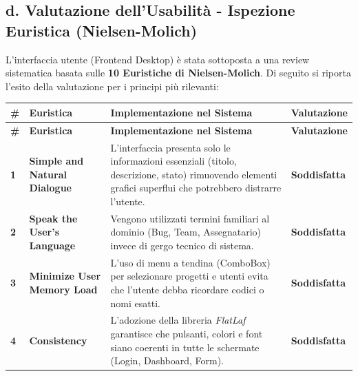 \documentclass[a4paper,12pt]{article}
\begin{document}
\newpage
\subsection*{d. Valutazione dell'Usabilità - Ispezione Euristica (Nielsen-Molich)}
L'interfaccia utente (Frontend Desktop) è stata sottoposta a una review sistematica basata sulle \textbf{10 Euristiche di Nielsen-Molich}. Di seguito si riporta l'esito della valutazione per i principi più rilevanti:
{}

\renewcommand{\arraystretch}{1.5}
\begin{longtable}{|p{0.8cm}|p{4.5cm}|p{5.0cm}|p{3.5cm}|}
    \hline
    \rowcolor{UninaBlue} 
    \textbf{\color{white}\#} & \textbf{\color{white}Euristica} & \textbf{\color{white}Implementazione nel Sistema} & \textbf{\color{white}Valutazione} \\ 
    \hline
    \endfirsthead
    \hline
    \rowcolor{UninaBlue} 
    \textbf{\color{white}\#} & \textbf{\color{white}Euristica} & \textbf{\color{white}Implementazione nel Sistema} & \textbf{\color{white}Valutazione} \\ 
    \hline
    \endhead

    \textbf{1} & \textbf{Simple and Natural Dialogue} & 
    L'interfaccia presenta solo le informazioni essenziali (titolo, descrizione, stato) rimuovendo elementi grafici superflui che potrebbero distrarre l'utente. & 
    \textbf{\textcolor{green!70!black}{Soddisfatta}} \\ \hline

    \textbf{2} & \textbf{Speak the User’s Language} & 
    Vengono utilizzati termini familiari al dominio (Bug, Team, Assegnatario) invece di gergo tecnico di sistema. & 
    \textbf{\textcolor{green!70!black}{Soddisfatta}} \\ \hline

    \textbf{3} & \textbf{Minimize User Memory Load} & 
    L'uso di menu a tendina (ComboBox) per selezionare progetti e utenti evita che l'utente debba ricordare codici o nomi esatti. & 
    \textbf{\textcolor{green!70!black}{Soddisfatta}} \\ \hline

    \textbf{4} & \textbf{Consistency} & 
    L'adozione della libreria \textit{FlatLaf} garantisce che pulsanti, colori e font siano coerenti in tutte le schermate (Login, Dashboard, Form). & 
    \textbf{\textcolor{green!70!black}{Soddisfatta}} \\ \hline


\end{longtable}
\end{document}
